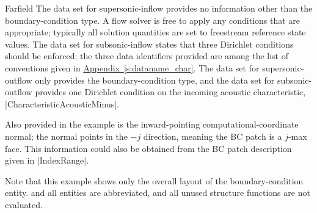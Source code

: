 \begin{example}{Farfield}
The data set for supersonic-inflow provides no information
other than the boundary-condition type.  A flow solver is
free to apply any conditions that are appropriate; typically
all solution quantities are set to freestream reference state
values.  The data set for subsonic-inflow states that three
Dirichlet conditions should be enforced; the three data
identifiers provided are among the list of conventions given in
\hyperref[s:dataname_char]{Appendix~\ref*{s:dataname_char}}.
The data set for supersonic-outflow only provides the boundary-condition
type, and the data set for subsonic-outflow provides one
Dirichlet condition on the incoming acoustic characteristic,
|CharacteristicAcousticMinus|.

Also provided in the example is the inward-pointing
computational-coordinate normal; the normal points in the $-j$
direction, meaning the BC patch is a $j$-max face.  This information
could also be obtained from the BC patch description given in
|IndexRange|.

Note that this example shows only the overall layout of the
boundary-condition entity.
 and all  entities are abbreviated,
and all unused structure functions are not evaluated.
\end{example}

